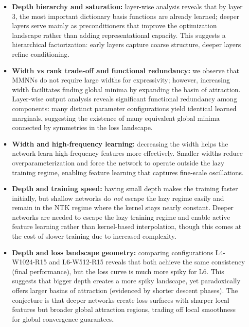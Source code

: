 \documentclass[12pt]{article}
\begin{document}
\begin{itemize}
    \item \textbf{Depth hierarchy and saturation:} layer-wise analysis reveals that by layer 3, the most important dictionary basis functions are already learned; deeper layers serve mainly as preconditioners that improve the optimization landscape rather than adding representational capacity. This suggests a hierarchical factorization: early layers capture coarse structure, deeper layers refine conditioning.\\
    
    \item \textbf{Width vs rank trade-off and functional redundancy:} we observe that MMNNs do not require large widths for expressivity; however, increasing width facilitates finding global minima by expanding the basin of attraction. Layer-wise output analysis reveals significant functional redundancy among components: many distinct parameter configurations yield identical learned marginals, suggesting the existence of many equivalent global minima connected by symmetries in the loss landscape.\\
    
    \item \textbf{Width and high-frequency learning:} decreasing the width helps the network learn high-frequency features more effectively. Smaller widths reduce overparameterization and force the network to operate outside the lazy training regime, enabling feature learning that captures fine-scale oscillations.\\
    
    \item \textbf{Depth and training speed:} having small depth makes the training faster initially, but shallow networks do \emph{not} escape the lazy regime easily and remain in the NTK regime where the kernel stays nearly constant. Deeper networks are needed to escape the lazy training regime and enable active feature learning rather than kernel-based interpolation, though this comes at the cost of slower training due to increased complexity.\\
    
    \item \textbf{Depth and loss landscape geometry:} comparing configurations L4-W1024-R15 and L6-W512-R15 reveals that both achieve the same consistency (final performance), but the loss curve is much more spiky for L6. This suggests that bigger depth creates a more spiky landscape, yet paradoxically offers larger basins of attraction (evidenced by shorter descent phases). The conjecture is that deeper networks create loss surfaces with sharper local features but broader global attraction regions, trading off local smoothness for global convergence guarantees.\\
    

\end{itemize}
\end{document}
